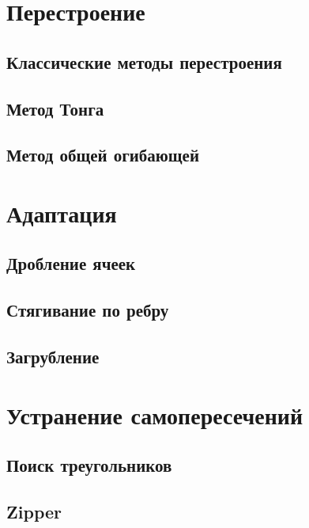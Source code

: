 \documentclass[
11pt,%
tightenlines,%
twoside,%
onecolumn,%
nofloats,%
nobibnotes,%
nofootinbib,%
superscriptaddress,%
noshowpacs,%
centertags]%
{revtex4}
\begin{document}
\section{Перестроение}

\subsection{Классические методы перестроения}

\subsection{Метод Тонга}

\subsection{Метод общей огибающей}



\section{Адаптация}
\subsection{Дробление ячеек}

\subsection{Стягивание по ребру}

\subsection{Загрубление}



\section{Устранение самопересечений}
\subsection{Поиск треугольников}

\subsection{Zipper}

\end{document}
